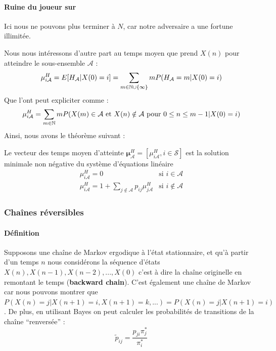 \documentclass[11pt,a4paper]{article}
\numberwithin{equation}{section}
\begin{document}

\paragraph{Ruine du joueur sur \N}
Ici nous ne pouvons plus terminer à $N$, car notre adversaire a une fortune illimitée. 


Nous nous intéressons d'autre part au temps moyen que prend $X(n)$ pour atteindre le sous-ensemble $\mathcal{A}$ :
\[\mu_{i\mathcal{A}}^H = E[H_\mathcal{A} |X(0) = i] = \sum_{m \in \mathbb{N} \cup \{\infty\}} m P(H_\mathcal{A} = m | X(0) = i)\]
Que l'ont peut expliciter comme :
\begin{equation}
	\mu_{i\mathcal{A}}^H = \sum_{m \in \mathbb{N}} m P(X(m) \in \mathcal{A} \text{ et } X(n) \notin \mathcal{A} \text{ pour } 0 \leq n \leq m-1 | X(0) = i) 
\end{equation}
Ainsi, nous avons le théorème suivant :

\begin{boite}
	 Le vecteur des temps moyen d'atteinte $\boldsymbol{\mu}_\mathcal{A}^H = [\mu_{i\mathcal{A}}^H, i \in \mathcal{S}]$ est la solution minimale non négative du système d'équations linéaire
	\begin{equation}
            \begin{array}{ll}
                \mu_{i\mathcal{A}}^H = 0 & \text{si } i \in \mathcal{A}\\
                \mu_{i\mathcal{A}}^H = 1 + \sum_{j \notin \mathcal{A}}p_{ij}\mu_{j\mathcal{A}}^H & \text{si } i \notin \mathcal{A}
            \end{array}
	\end{equation}
\end{boite}

\subsubsection{Chaînes réversibles}
\paragraph{Définition}

Supposons une chaîne de Markov ergodique à l'état stationnaire, et qu'à partir d'un temps $n$ nous considérons la séquence d'états $X(n), X(n-1), X(n-2),...,X(0)$ c'est à dire la chaîne originelle en remontant le temps (\textbf{backward chain}). C'est également une chaîne de Markov car nous pouvons montrer que $P(X(n) = j | X(n+1) = i, X(n+1) = k,...) = P(X(n) = j | X(n+1) = i)$. De plus, en utilisant Bayes on peut calculer les probabilités de transitions de la chaîne ``renversée'' :
\begin{equation}
    \tilde{p}_{ij} = \frac{p_{ji}\pi_j^*}{\pi_i^*}
\end{equation}
\end{document}
